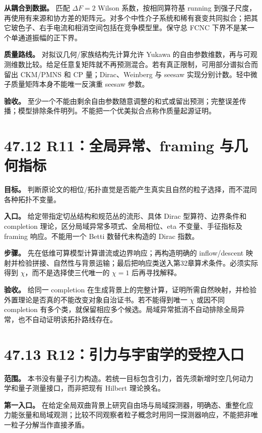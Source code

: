 \documentclass[
  11pt,
  oneside]{book}
\begin{document}
\textbf{从耦合到数据。} 匹配 \(\Delta F=2\) Wilson 系数，按相同算符基
running
到强子尺度，再使用有来源和协方差的矩阵元。对多个中性介子系统和稀有衰变共同拟合；把其它玻色子、右手电流和相消空间包括在竞争模型里。保守总
FCNC 下界不是某一个单通道振幅的正下界。

\textbf{质量路线。} 对拟议几何/家族结构先计算允许 Yukawa
的自由参数维数，再与可观测维数比较。给足任意复矩阵就不再预测混合。若有真正限制，可用部分谱拟合而留出
CKM/PMNS 和 CP 量；Dirac、Weinberg 与 seesaw
实现分别计数。轻中微子质量矩阵本身不能唯一反演重 seesaw 参数。

\textbf{验收。}
至少一个不能由剩余自由参数随意调整的和式或留出预测；完整误差传播；模型排除条件明列。不能把一个优美拟合点称作质量起源证明。

\section{47.12 R11：全局异常、framing 与几何指标}

\textbf{目标。}
判断原论文的相位/拓扑直觉是否能产生真实且自然的粒子选择，而不混同各种拓扑不变量。

\textbf{入口。} 给定带指定切丛结构和规范丛的流形、具体 Dirac
型算符、边界条件和 completion 理论，区分局域异常多项式、全局相位、eta
不变量、手征指标及 framing 响应。不能用一个 Betti 数替代未构造的 Dirac
指数。

\textbf{步骤。} 先在低维可算模型计算谱流或边界响应；再构造明确的
inflow/descent
映射并检验拼接、自然性与背景运输；最后把响应类送入第32章算术条件。必须实际得到
\(\chi\)，而不是选择使三代唯一的 \(\chi=1\) 后再寻找解释。

\textbf{验收。} 给同一 completion
在生成背景上的完整计算，证明所需自然映射，并检验外置理论是否真的不能改变对象自治证书。若不能得到唯一
\(\chi\) 或因不同 completion
有多个类，就保留相应多个候选。局域异常抵消不自动排除全局异常，也不自动证明该拓扑路线存在。

\section{47.13 R12：引力与宇宙学的受控入口}

\textbf{范围。}
本书没有量子引力构造。若统一目标包含引力，首先须新增时空几何动力学和量子测量接口，而非把现有
Hilbert 理论换名。

\textbf{第一入口。}
在给定全局双曲背景上研究自由场与局域探测器，明确态、重整化应力能张量和局域观测；比较不同观察者粒子概念时用同一探测器响应，不能把非唯一粒子分解当作直接矛盾。
\end{document}
